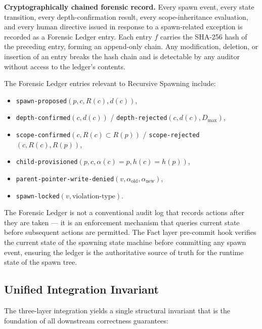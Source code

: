 \medskip\noindent\textbf{Cryptographically chained forensic record.}  Every
spawn event, every state transition, every depth-confirmation result, every
scope-inheritance evaluation, and every human directive issued in response to a
spawn-related exception is recorded as a Forensic Ledger entry.  Each entry $f$
carries the SHA-256 hash of the preceding entry, forming an append-only chain.
Any modification, deletion, or insertion of an entry breaks the hash chain and
is detectable by any auditor without access to the ledger's contents.

The Forensic Ledger entries relevant to Recursive Spawning include:
\begin{itemize}\itemsep=0pt
  \item \texttt{spawn-proposed}$(p, c, R(c), d(c))$,
  \item \texttt{depth-confirmed}$(c, d(c))$ / \texttt{depth-rejected}$(c, d(c), D_{\max})$,
  \item \texttt{scope-confirmed}$(c, R(c) \subset R(p))$ / \texttt{scope-rejected}$(c, R(c), R(p))$,
  \item \texttt{child-provisioned}$(p, c, \alpha(c)=p, h(c)=h(p))$,
  \item \texttt{parent-pointer-write-denied}$(v, \alpha_{\text{old}}, \alpha_{\text{new}})$,
  \item \texttt{spawn-locked}$(v, \text{violation-type})$.
\end{itemize}

The Forensic Ledger is not a conventional audit log that records actions after
they are taken --- it is an enforcement mechanism that queries current state
before subsequent actions are permitted.  The Fact layer pre-commit hook
verifies the current state of the spawning state machine before committing any
spawn event, ensuring the ledger is the authoritative source of truth for the
runtime state of the spawn tree.

\subsection{Unified Integration Invariant}
\label{sec:rs-unified-inv}

The three-layer integration yields a single structural invariant that is the
foundation of all downstream correctness guarantees:

